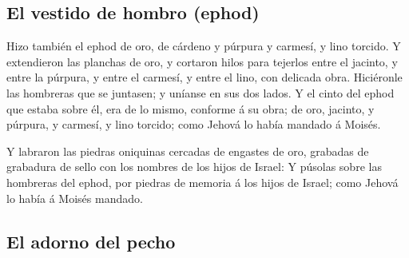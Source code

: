 \hypertarget{el-vestido-de-hombro-ephod-1}{%
\subsection{El vestido de hombro
(ephod)}\label{el-vestido-de-hombro-ephod-1}}

 Hizo también el ephod de oro, de cárdeno y púrpura y
carmesí, y lino torcido.  Y extendieron las planchas de oro,
y cortaron hilos para tejerlos entre el jacinto, y entre la púrpura, y
entre el carmesí, y entre el lino, con delicada obra. 
Hiciéronle las hombreras que se juntasen; y uníanse en sus dos lados.
 Y el cinto del ephod que estaba sobre él, era de lo mismo,
conforme á su obra; de oro, jacinto, y púrpura, y carmesí, y lino
torcido; como Jehová lo había mandado á Moisés.

 Y labraron las piedras oniquinas cercadas de engastes de
oro, grabadas de grabadura de sello con los nombres de los hijos de
Israel:  Y púsolas sobre las hombreras del ephod, por
piedras de memoria á los hijos de Israel; como Jehová lo había á Moisés
mandado.

\hypertarget{el-adorno-del-pecho}{%
\subsection{El adorno del pecho}\label{el-adorno-del-pecho}}

